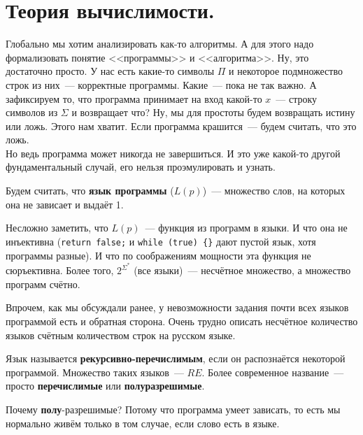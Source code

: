 \documentclass{article}
\begin{document}
    \section{Теория вычислимости.}
    \begin{remark}
        Глобально мы хотим анализировать как-то алгоритмы. А для этого надо формализовать понятие <<программы>> и <<алгоритма>>. Ну, это достаточно просто. У нас есть какие-то символы $\Pi$ и некоторое подмножество строк из них~--- корректные программы. Какие~--- пока не так важно. А зафиксируем то, что программа принимает на вход какой-то $x$~--- строку символов из $\Sigma$ и возвращает что? Ну, мы для простоты будем возвращать истину или ложь. Этого нам хватит. Если программа крашится~--- будем считать, что это ложь.\\
        Но ведь программа может никогда не завершиться. И это уже какой-то другой фундаментальный случай, его нельзя проэмулировать и узнать.
    \end{remark}
    \begin{definition}
        Будем считать, что \textbf{язык программы} ($L(p)$)~--- множество слов, на которых она не зависает и выдаёт 1.
    \end{definition}
    \begin{claim}
        Несложно заметить, что $L(p)$~--- функция из программ в языки. И что она не инъективна (\Verb|return false;| и \Verb|while (true) {}| дают пустой язык, хотя программы разные). И что по соображениям мощности эта функция не сюръективна. Более того, $2^{\Sigma^*}$ (все языки)~--- несчётное множество, а множество программ счётно.
    \end{claim}
    \begin{remark}
        Впрочем, как мы обсуждали ранее, у невозможности задания почти всех языков программой есть и обратная сторона. Очень трудно описать несчётное количество языков счётным количеством строк на русском языке.
    \end{remark}
    \begin{definition}
        Язык называется \textbf{рекурсивно-перечислимым}, если он распознаётся некоторой программой. Множество таких языков~--- $RE$. Более современное название~--- просто \textbf{перечислимые} или \textbf{полуразрешимые}.
    \end{definition}
    \begin{remark}
        Почему \textbf{полу}-разрешимые? Потому что программа умеет зависать, то есть мы нормально живём только в том случае, если слово есть в языке.
    \end{remark}
\end{document}
